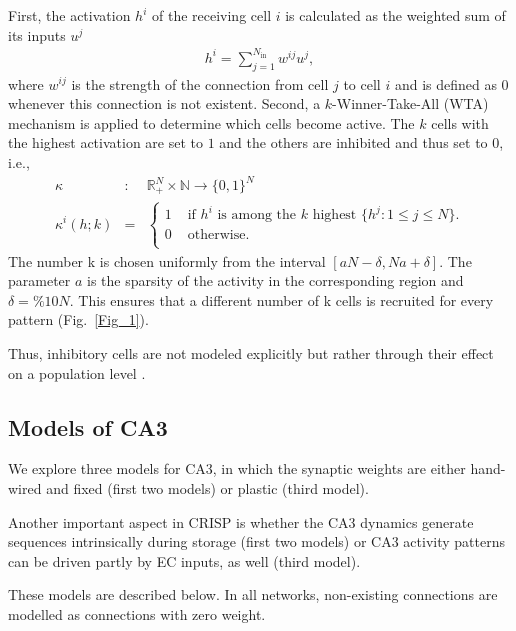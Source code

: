 \documentclass[utf8]{frontiersSCNS} %
\begin{document}
First, the activation $h^i$ of the receiving cell $i$ is calculated as the weighted sum of its inputs $u^j$
\begin{align}
	\label{activation}
	h^i = \sum_{j=1}^{N_\mathrm{in}} w^{ij}u^j,
\end{align}  
where $w^{ij}$ is the strength of the connection from cell $j$ to cell $i$ and is defined as $0$ whenever this connection is not existent. Second, a $k$-Winner-Take-All (WTA) mechanism is applied to determine which cells become active. The $k$ cells with the highest activation are set to $1$ and the others are inhibited and thus set to $0$, i.e.,
\begin{eqnarray}
\label{eq:kWTA}
	\kappa &:& \mathbb{R}_+^N \times \mathbb{N} \to \{0,1\}^N \\
	\kappa^i (h;k) &=& \left \{ \begin{array}{ll}
			1 &\text{ if $h^i$ is among the $k$ highest } \{ h^j:1\le j\le N \}. \\
			0 &\text{ otherwise}.\\
	\end{array} \right.
	\label{eq:binary}
\end{eqnarray}
The number k is chosen uniformly from the interval $ [aN - \delta , Na + \delta ]$. The parameter $a$ is the sparsity of the activity in the corresponding region and $\delta = \% 10 N$. This ensures that a different number of k cells is recruited for every pattern (Fig.~\ref{Fig_1}). 

Thus, inhibitory cells are not modeled explicitly but rather through their effect on a population level \cite{renno2010mechanism, roudi2008representing, moustafa2009neurocomputational, appleby2011role, monaco2011modular}.


\subsection{Models of CA3}
\label{ca3:models}


We explore three models for CA3, in which the synaptic weights are either hand-wired and fixed (first two models) or plastic (third model). 

Another important aspect in CRISP is whether the CA3 dynamics generate sequences intrinsically during storage (first two models) or CA3 activity patterns can be driven partly by EC inputs, as well (third model). 

These models are described below.
In all networks, non-existing connections are modelled as connections with zero weight.
\end{document}
